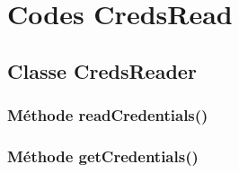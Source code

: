 \chapter*{Codes CredsRead}

\makeatletter
\renewcommand{\thesection}{\@arabic\c@section}
\makeatother



\section{Classe CredsReader}

\subsection{Méthode readCredentials()}
\label{sec:readCredentials()}


\vspace{1cm}

\subsection{Méthode getCredentials()}
\label{sec:getCredentials()}
